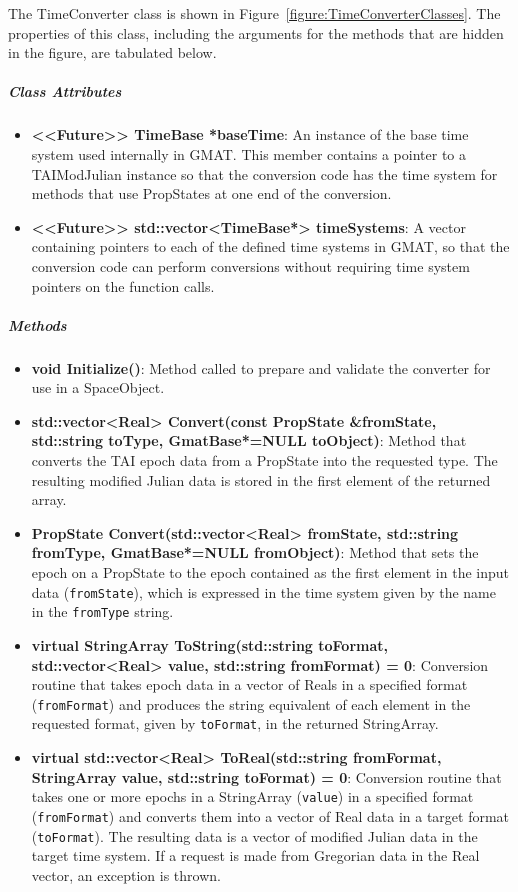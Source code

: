 The TimeConverter class is shown in Figure~\ref{figure:TimeConverterClasses}.  The properties of
this class, including the arguments for the methods that are hidden in the figure, are tabulated
below.

\subparagraph{\textit{Class Attributes}}

\begin{itemize}
\item \textbf{<<Future>> TimeBase *baseTime}: An instance of the base time system used internally in
GMAT. This member contains a pointer to a TAIModJulian instance so that the conversion code has the
time system for methods that use PropStates at one end of the conversion.
\item \textbf{<<Future>> std::vector<TimeBase*> timeSystems}: A vector containing pointers to
each of the defined time systems in GMAT, so that the conversion code can perform conversions
without requiring time system pointers on the function calls.
\end{itemize}

\subparagraph{\textit{Methods}}

\begin{itemize}
\item \textbf{void Initialize()}: Method called to prepare and validate the converter for use in a
SpaceObject.
\item \textbf{std::vector<Real> Convert(const PropState \&fromState, std::string toType,
GmatBase*=NULL
toObject)}: Method that converts the TAI epoch data from a PropState into the requested type.
The resulting modified Julian data is stored in the first element of the returned array.
\item \textbf{PropState Convert(std::vector<Real> fromState, std::string fromType, GmatBase*=NULL
fromObject)}: Method that sets the epoch on a PropState to the epoch contained as the first
element in the input data (\texttt{fromState}), which is expressed in the time system given by the
name in the \texttt{fromType} string.
\item \textbf{virtual StringArray ToString(std::string toFormat, std::vector<Real> value,
std::string fromFormat) = 0}: Conversion routine that takes epoch data in a vector of Reals in a
specified format (\texttt{fromFormat}) and produces the string equivalent of each element in the
requested format, given by \texttt{toFormat}, in the returned StringArray.
\item \textbf{virtual std::vector<Real> ToReal(std::string fromFormat, StringArray value,
std::string toFormat) = 0}: Conversion routine that takes one or more epochs in a StringArray
(\texttt{value}) in a specified format (\texttt{fromFormat}) and converts them into a vector of
Real data in a target format (\texttt{toFormat}).  The resulting data is a vector of modified
Julian data in the target time system.  If a request is made from Gregorian data in the Real
vector, an exception is thrown.
\end{itemize}

